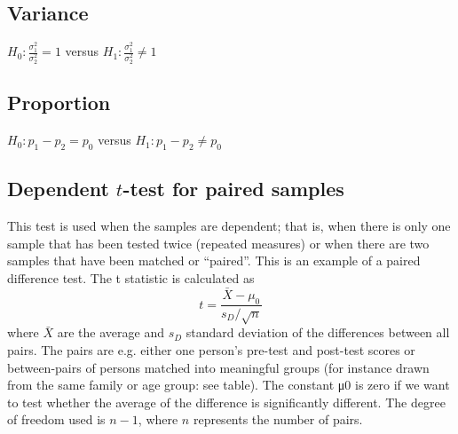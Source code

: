 \subsection{Variance}

$H_0: \frac{\sigma^2_1}{\sigma^2_2} = 1$ versus $H_1: \frac{\sigma^2_1}{\sigma^2_2} \neq 1$

\subsection{Proportion}

$H_0: p_1 -p_2 = p_0$ versus $H_1: p_1-p_2 \neq p_0$


\subsection{Dependent $t$-test for paired samples}

This test is used when the samples are dependent; that is, when there is only one sample that has been tested twice (repeated measures) or when there are two samples that have been matched or ``paired''. This is an example of a paired difference test. The t statistic is calculated as
\[
    t = \frac{\bar{X}-\mu_0}{s_D/\sqrt{n}}
\]
where $\bar{X}$ are the average and $s_D$ standard deviation of the differences between all pairs. The pairs are e.g. either one person's pre-test and post-test scores or between-pairs of persons matched into meaningful groups (for instance drawn from the same family or age group: see table). The constant μ0 is zero if we want to test whether the average of the difference is significantly different. The degree of freedom used is $n-1$, where $n$ represents the number of pairs. 
